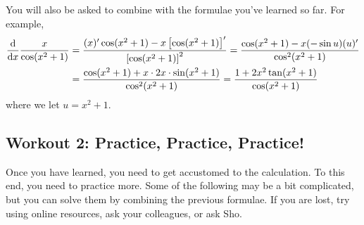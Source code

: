 \documentclass[11pt,pdfa,lastpage]{MishoNote}
\newif\ifBasicForm\BasicFormtrue
\begin{document}
\begin{problems}
\end{problems}

You will also be asked to combine with the formulae you've learned so far. For example,
  \begin{align*}
  \diff{}{x}\frac{x}{\cos(x^2+1)}
  &= \frac{(x)'\cos(x^2+1)-x\left[\cos(x^2+1)\right]'}{\left[\cos(x^2+1)\right]^2}
  = \frac{\cos(x^2+1)-x(-\sin u)(u)'}{\cos^2(x^2+1)}
  \\&= \frac{\cos(x^2+1)+x\cdot 2x\cdot \sin (x^2+1)}{\cos^2(x^2+1)} = \frac{1+2x^2\tan(x^2+1)}{\cos(x^2+1)}
  \end{align*}
where we let $u=x^2+1$.

\ifBasicForm\pagebreak\fi

\subsection{Workout 2: Practice, Practice, Practice!}
Once you have learned, you need to get accustomed to the calculation. To this end, you need to practice more.
Some of the following may be a bit complicated, but you can solve them by combining the previous formulae.
If you are lost, try using online resources, ask your colleagues, or ask Sho.
\end{document}

